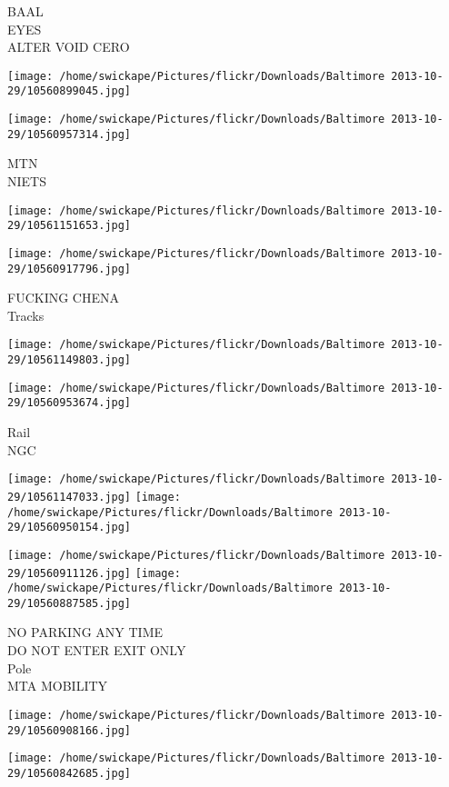\documentclass[10pt,letterpaper]{article}
\begin{document}
BAAL\\
EYES\\
ALTER VOID CERO
\pagebreak

\texttt{[image: /home/swickape/Pictures/flickr/Downloads/Baltimore 2013-10-29/10560899045.jpg]}

\vspace{0.25in}
\texttt{[image: /home/swickape/Pictures/flickr/Downloads/Baltimore 2013-10-29/10560957314.jpg]}

MTN\\
NIETS
\pagebreak

\texttt{[image: /home/swickape/Pictures/flickr/Downloads/Baltimore 2013-10-29/10561151653.jpg]}

\vspace{0.25in}
\texttt{[image: /home/swickape/Pictures/flickr/Downloads/Baltimore 2013-10-29/10560917796.jpg]}

FUCKING CHENA\\
Tracks
\pagebreak

\texttt{[image: /home/swickape/Pictures/flickr/Downloads/Baltimore 2013-10-29/10561149803.jpg]}

\vspace{0.25in}
\texttt{[image: /home/swickape/Pictures/flickr/Downloads/Baltimore 2013-10-29/10560953674.jpg]}

Rail\\
NGC
\pagebreak

\texttt{[image: /home/swickape/Pictures/flickr/Downloads/Baltimore 2013-10-29/10561147033.jpg]}
\texttt{[image: /home/swickape/Pictures/flickr/Downloads/Baltimore 2013-10-29/10560950154.jpg]}

\texttt{[image: /home/swickape/Pictures/flickr/Downloads/Baltimore 2013-10-29/10560911126.jpg]}
\texttt{[image: /home/swickape/Pictures/flickr/Downloads/Baltimore 2013-10-29/10560887585.jpg]}

NO PARKING ANY TIME\\
DO NOT ENTER EXIT ONLY\\
Pole\\
MTA MOBILITY
\pagebreak

\texttt{[image: /home/swickape/Pictures/flickr/Downloads/Baltimore 2013-10-29/10560908166.jpg]}

\vspace{0.25in}
\texttt{[image: /home/swickape/Pictures/flickr/Downloads/Baltimore 2013-10-29/10560842685.jpg]}
\end{document}
